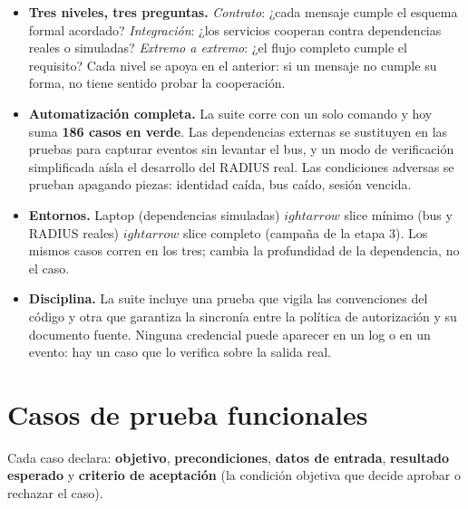 \documentclass[11pt,a4paper]{article}
\begin{document}
\begin{itemize}
\item \textbf{Tres niveles, tres preguntas.} \emph{Contrato}: ¿cada mensaje cumple el esquema formal acordado? \emph{Integración}: ¿los servicios cooperan contra dependencias reales o simuladas? \emph{Extremo a extremo}: ¿el flujo completo cumple el requisito? Cada nivel se apoya en el anterior: si un mensaje no cumple su forma, no tiene sentido probar la cooperación.
\item \textbf{Automatización completa.} La suite corre con un solo comando y hoy suma \textbf{186 casos en verde}. Las dependencias externas se sustituyen en las pruebas para capturar eventos sin levantar el bus, y un modo de verificación simplificada aísla el desarrollo del RADIUS real. Las condiciones adversas se prueban apagando piezas: identidad caída, bus caído, sesión vencida.
\item \textbf{Entornos.} Laptop (dependencias simuladas) $
ightarrow$ slice mínimo (bus y RADIUS reales) $
ightarrow$ slice completo (campaña de la etapa 3). Los mismos casos corren en los tres; cambia la profundidad de la dependencia, no el caso.
\item \textbf{Disciplina.} La suite incluye una prueba que vigila las convenciones del código y otra que garantiza la sincronía entre la política de autorización y su documento fuente. Ninguna credencial puede aparecer en un log o en un evento: hay un caso que lo verifica sobre la salida real.
\end{itemize}

\section{Casos de prueba funcionales}

Cada caso declara: \textbf{objetivo}, \textbf{precondiciones}, \textbf{datos de entrada}, \textbf{resultado esperado} y \textbf{criterio de aceptación} (la condición objetiva que decide aprobar o rechazar el caso).
\end{document}
